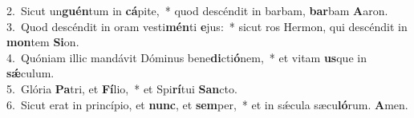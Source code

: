 {2.~}Sicut un\textbf{guén}tum in \textbf{cá}pite,~* quod descéndit in barbam, \textbf{bar}bam \textbf{A}aron.\\
{3.~}Quod descéndit in oram vesti\textbf{mén}ti \textbf{e}jus:~* sicut ros Hermon, qui descéndit in \textbf{mon}tem \textbf{Si}on.\\
{4.~}Quóniam illic mandávit Dóminus bene\textbf{di}cti\textbf{ó}nem,~* et vitam \textbf{us}que in \textbf{sǽ}culum.\\
{5.~}Glória \textbf{Pa}tri, et \textbf{Fí}lio,~* et Spi\textbf{rí}tui \textbf{San}cto.\\
{6.~}Sicut erat in princípio, et \textbf{nunc}, et \textbf{sem}per,~* et in sǽcula sæcu\textbf{ló}rum. \textbf{A}men.\\
